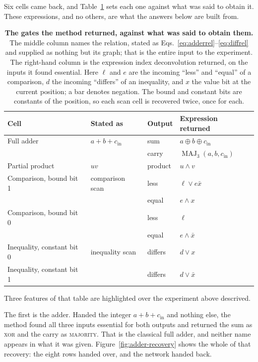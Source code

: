 \documentclass[11pt,a4paper]{article}
\newcommand{\Maj}{\operatorname{MAJ}_3}
\begin{document}
Six cells came back, and Table~\ref{tab:cells} sets each one against what was
said to obtain it. These expressions, and no others, are what the answers below
are built from.

\begin{table}[htbp]
\centering
\caption{\textbf{The gates the method returned, against what was said to obtain
them.} The middle column names the relation, stated as
Eqs.~\eqref{eq:adderrel}--\eqref{eq:diffrel} and supplied as nothing but its
graph; that is the entire input to the experiment. The right-hand column is the
expression index deconvolution returned, on the inputs it found essential.
Here $\ell$ and $e$ are the incoming ``less'' and ``equal'' of a comparison,
$d$ the incoming ``differs'' of an inequality, and $x$ the value bit at the
current position; a bar denotes negation. The bound and constant bits are
constants of the position, so each scan cell is recovered twice, once for
each.}\label{tab:cells}
\begin{tabular}{llll} 
\toprule
Cell & Stated as & Output & Expression returned\\\midrule
Full adder & $a+b+c_{\mathrm{in}}$ & sum & $a\oplus b\oplus c_{\mathrm{in}}$\\
 & & carry & $\Maj(a,b,c_{\mathrm{in}})$\\[2pt]
Partial product & $uv$ & product & $u\wedge v$\\[2pt]
Comparison, bound bit 1 & comparison scan & less & $\ell\vee e\bar x$\\
 & & equal & $e\wedge x$\\[2pt]
Comparison, bound bit 0 & & less & $\ell$\\
 & & equal & $e\wedge\bar x$\\[2pt]
Inequality, constant bit 0 & inequality scan & differs & $d\vee x$\\
Inequality, constant bit 1 & & differs & $d\vee\bar x$\\
\bottomrule
\end{tabular}
\end{table} 

Three features of that table are highlighted over the experiment above descrived.

The first is the adder. Handed the integer $a+b+c_{\mathrm{in}}$ and nothing
else, the method found all three inputs essential for both outputs and returned
the sum as \textsc{xor} and the carry as \textsc{majority}. That is the
classical full adder, and neither name appears in what it was given.
Figure~\ref{fig:adder-recovery} shows the whole of that recovery: the eight rows
handed over, and the network handed back.
\end{document}
